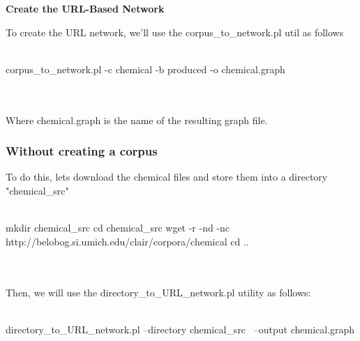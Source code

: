 \textbf{Create the URL-Based Network}

To create the URL network, we'll use the corpus\_to\_network.pl util as follows
\\
\\
\begin{boxedverbatim}
 corpus_to_network.pl -c chemical -b produced -o chemical.graph
\end{boxedverbatim}
\\
\\
Where chemical.graph is the name of the resulting graph file.


\subsubsection{Without creating a corpus}

To do this, lets download the chemical files and store them into a directory "chemical\_src"
\\
\\
\begin{boxedverbatim}
 mkdir chemical_src
 cd chemical_src
 wget -r -nd -nc http://belobog.si.umich.edu/clair/corpora/chemical
 cd ..
\end{boxedverbatim}
\\
\\
Then, we will use the directory\_to\_URL\_network.pl utility as follows:
\\
\\
\begin{boxedverbatim}
 directory\_to\_URL_network.pl --directory chemical_src \
 --output chemical.graph
\end{boxedverbatim}